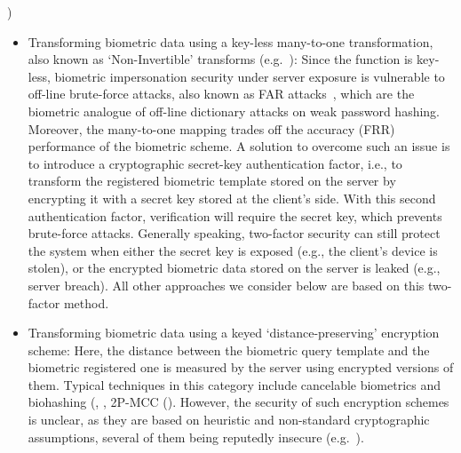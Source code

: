 \cite{jain2008biometric}) \begin{itemize} \item Transforming biometric data
  using a key-less many-to-one transformation, also known as `Non-Invertible'
  transforms (e.g.~\cite{ratha2007generating}): Since the function is key-less,
  biometric impersonation security under server exposure is vulnerable to
  off-line brute-force attacks, also known as FAR
  attacks~\cite{uludag2004attacks,roberts2007biometric}, which are the biometric
  analogue of off-line dictionary attacks on weak password hashing. Moreover,
  the many-to-one mapping trades off the accuracy (FRR) performance of
  the biometric scheme. A solution to overcome such an issue is to introduce a
  cryptographic secret-key authentication factor, i.e., to transform the
  registered biometric template stored on the server by encrypting it with a
  secret key stored at the client's side. With this second authentication
  factor, verification will require the secret key, which prevents brute-force
  attacks. Generally speaking, two-factor security can still protect the system when either the secret key is exposed (e.g., the client's device is
  stolen), or the encrypted biometric data stored on the server is leaked (e.g.,
  server breach). All other approaches we consider below are based on this
  two-factor method.


\item Transforming biometric data using a keyed `distance-preserving' encryption scheme:  Here, the distance between the biometric query template and the biometric registered one is measured by the server using encrypted versions of them.  Typical techniques in this category include
            cancelable biometrics and biohashing (\cite{teoh2008cancellable}, \cite{jin2004biohashing}, 2P-MCC (\cite{cappelli2010minutia}). %
However, the security of such encryption schemes is unclear, as they are based on heuristic and non-standard cryptographic assumptions, several of them being reputedly insecure (e.g.~\cite{lee2009inverse,lacharme2013preimage}).


\end{itemize}
